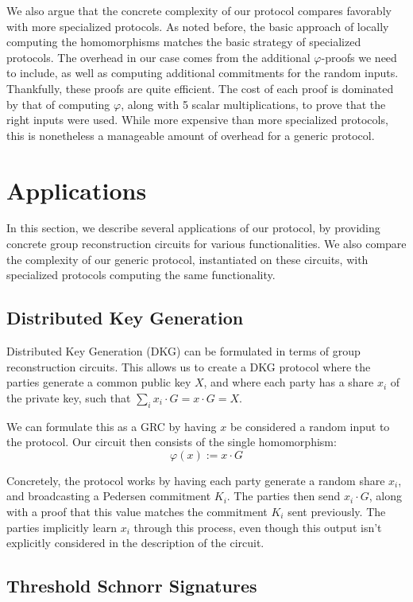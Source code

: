 We also argue that the concrete complexity of our protocol
compares favorably with more specialized protocols.
As noted before, the basic approach of locally computing
the homomorphisms matches the basic strategy of specialized protocols.
The overhead in our case comes from the additional $\varphi$-proofs
we need to include, as well as computing additional commitments
for the random inputs.
Thankfully, these proofs are quite efficient.
The cost of each proof is dominated by that of computing
$\varphi$, along with 5 scalar multiplications, to prove that
the right inputs were used.
While more expensive than more specialized protocols,
this is nonetheless a manageable amount of overhead for
a generic protocol.

\section{Applications}
\label{sec:applications}

In this section, we describe several applications of our protocol,
by providing concrete group reconstruction circuits
for various functionalities.
We also compare the complexity of our generic protocol,
instantiated on these circuits, with specialized
protocols computing the same functionality.

\subsection{Distributed Key Generation}
\label{sec:dkg}

Distributed Key Generation (DKG) can be formulated in terms of group
reconstruction circuits.
This allows us to create a DKG protocol where the parties
generate a common public key $X$, and where each party has
a share $x_i$ of the private key, such that $\sum_i x_i \cdot G = x \cdot G = X$.

We can formulate this as a GRC by having $x$ be considered a
random input to the protocol. 
Our circuit then consists of the single homomorphism:
$$
\varphi(x) := x \cdot G
$$

Concretely, the protocol works by having each party
generate a random share $x_i$, and broadcasting a Pedersen commitment
$K_i$.
The parties then send $x_i \cdot G$, along with a proof that
this value matches the commitment $K_i$ sent previously.
The parties implicitly learn $x_i$ through this process,
even though this output isn't explicitly considered in the description
of the circuit.


\subsection{Threshold Schnorr Signatures}
\label{sec:schnorr}

